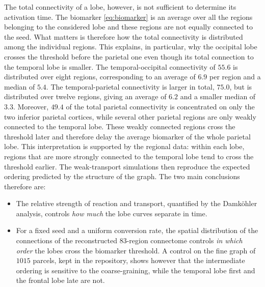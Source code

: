 The total connectivity of a lobe, however, is not sufficient to determine its activation time. The biomarker \eqref{eq:biomarker} is an average over all the regions belonging to the considered lobe and these regions are not equally connected to the seed. What matters is therefore how the total connectivity is distributed among the individual regions. This explains, in particular, why the occipital lobe crosses the threshold before the parietal one even though its total connection to the temporal lobe is smaller. The temporal-occipital connectivity of $55.6$ is distributed over eight regions, corresponding to an average of $6.9$ per region and a median of $5.4$. The temporal-parietal connectivity is larger in total, $75.0$, but is distributed over twelve regions, giving an average of $6.2$ and a smaller median of $3.3$. Moreover, $49.4$ of the total parietal connectivity is concentrated on only the two inferior parietal cortices, while several other parietal regions are only weakly connected to the temporal lobe. These weakly connected regions cross the threshold later and therefore delay the average biomarker of the whole parietal lobe. This interpretation is supported by the regional data: within each lobe, regions that are more strongly connected to the temporal lobe tend to cross the threshold earlier. The weak-transport simulations then reproduce the expected ordering predicted by the structure of the graph. The two main conclusions therefore are:

\begin{itemize}
    \item The relative strength of reaction and transport, quantified by the Damk\"ohler analysis, controls \emph{how much} the lobe curves separate in time.
    \item For a fixed seed and a uniform conversion rate, the spatial distribution of the connections of the reconstructed $83$-region connectome controls \emph{in which order} the lobes cross the biomarker threshold. A control on the fine graph of $1015$ parcels, kept in the repository, shows however that the intermediate ordering is sensitive to the coarse-graining, while the temporal lobe first and the frontal lobe late are not.
\end{itemize}

